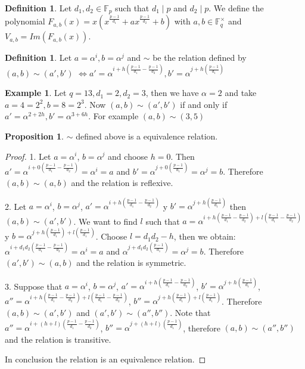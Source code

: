 \documentclass{article}
\theoremstyle{definition}
\newtheorem{definition}[theorem]{Definition}
\newtheorem{example}[theorem]{Example}
\newtheorem{prop}[theorem]{Proposition}
\theoremstyle{remark}
\numberwithin{equation}{section}
\begin{document}
\begin{definition}
  Let $d_1, d_2 \in \mathbb{F}_p$ such that $d_1 \mid p$ and $d_2 \mid p$. We define the polynomial $F_{a,b}(x) = x(x^{\frac{p-1}{d_1}} + ax^{\frac{p-1}{d_2}} +b)$ with $a,b \in \mathbb{F}_q^{\times}$ and $V_{a,b} = Im(F_{a,b}(x))$.
\end{definition}

\begin{definition}

  Let $a = \alpha^i, b = \alpha^j$ and $\sim$ be the relation defined by $(a,b) \sim (a', b')$ 
  $\Longleftrightarrow a' = \alpha^{i+h(\frac{p-1}{d_1} - \frac{p-1}{d_2})}, b' = \alpha^{j+h(\frac{p-1}{d_1})}$

\end{definition}

 \begin{example}
    Let $q = 13, d_1 = 2, d_2 = 3$, then we have $\alpha = 2$ and take $a = 4 = 2^2, b = 8 = 2^3$. Now $(a,b) \sim (a',b')$ if and only if
    $a' = \alpha^{2+2h}, b' = \alpha^{3+6h}$. For example $(a,b) \sim (3,5)$
  \end{example}

\begin{prop}
  
  $\sim$ defined above is a equivalence relation.

\end{prop}

\begin{proof}
  
  1. Let $a=\alpha^i$, $b=\alpha^j$ and choose $h=0$. Then $a' = \alpha^{i+0(\frac{p-1}{d_1}-\frac{p-1}{d_2})} = \alpha^i = a$ and $b' = \alpha^{j+0(\frac{p-1}{d_1})} = \alpha^j = b$. Therefore $(a,b) \sim (a,b)$ and the relation is reflexive.

  2. Let $a = \alpha^i$, $b=\alpha^j$, $a' = \alpha^{i+h(\frac{p-1}{d_1}-\frac{p-1}{d_2})}$ y $b' = \alpha^{j+h(\frac{p-1}{d_1})}$ then $(a,b) \sim (a',b')$. We want to find $l$ such that $a = \alpha^{i+h(\frac{p-1}{d_1}-\frac{p-1}{d_2})+l(\frac{p-1}{d_1}-\frac{p-1}{d_2})}$ y $b = \alpha^{j+h(\frac{p-1}{d_1})+l(\frac{p-1}{d_1})}$. Choose $l=d_1d_2-h$, then we obtain: $\alpha^{i+d_1d_2(\frac{p-1}{d_1}-\frac{p-1}{d_2})} = \alpha^i = a$ and $\alpha^{j+d_1d_2(\frac{p-1}{d_1})} = \alpha^j = b$. Therefore $(a',b') \sim (a,b) $ and the relation is symmetric.

  3. Suppose that $a = \alpha^i$, $b=\alpha^j$, $a' = \alpha^{i+h(\frac{p-1}{d_1}-\frac{p-1}{d_2})}$, $b' = \alpha^{j+h(\frac{p-1}{d_1})}$, $a'' = \alpha^{i+h(\frac{p-1}{d_1}-\frac{p-1}{d_2})+l(\frac{p-1}{d_1}-\frac{p-1}{d_2})}$, $b'' = \alpha^{j+h(\frac{p-1}{d_1})+l(\frac{p-1}{d_1})}$. Therefore $(a,b) \sim (a',b')$ and $(a',b') \sim (a'',b'')$. Note that $a'' = \alpha^{i+(h+l)(\frac{p-1}{d_1}-\frac{p-1}{d_2})}$, $b'' = \alpha^{j+(h+l)(\frac{p-1}{d_1})}$, therefore $(a,b) \sim (a'',b'')$ and the relation is transitive.

  In conclusion the relation is an equivalence relation.

\end{proof}
\end{document}
